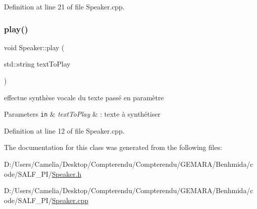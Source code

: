 Definition at line 21 of file Speaker.\+cpp.

\mbox{\label{class_speaker_ae59e5a67cc26d08a94a1eb0a759620c0}} 
\subsubsection{\texorpdfstring{play()}{play()}}
{\footnotesize\ttfamily void Speaker\+::play (\begin{DoxyParamCaption}\item[{std\+::string}]{text\+To\+Play }\end{DoxyParamCaption})}



effectue synthèse vocale du texte passé en paramètre 


\begin{DoxyParams}[1]{Parameters}
\mbox{\tt in}  & {\em text\+To\+Play} & \+: texte à synthétiser \\
\hline
\end{DoxyParams}


Definition at line 12 of file Speaker.\+cpp.



The documentation for this class was generated from the following files\+:\begin{DoxyCompactItemize}
\item 
D\+:/\+Users/\+Camelia/\+Desktop/\+Compterendu/\+Compterendu/\+G\+E\+M\+A\+R\+A/\+Benhmida/code/\+S\+A\+L\+F\+\_\+\+P\+I/\hyperlink{_speaker_8h}{Speaker.\+h}\item 
D\+:/\+Users/\+Camelia/\+Desktop/\+Compterendu/\+Compterendu/\+G\+E\+M\+A\+R\+A/\+Benhmida/code/\+S\+A\+L\+F\+\_\+\+P\+I/\hyperlink{_speaker_8cpp}{Speaker.\+cpp}\end{DoxyCompactItemize}
